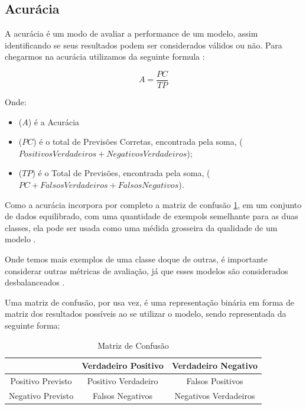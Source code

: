 \documentclass[
	12pt,				%
	openright,			%
	oneside,			%
	a4paper,			%
	english,			%
	brazil				%
	]{abntex2}
\begin{document}
\subsection{Acurácia}

A acurácia é um modo de avaliar a performance de um modelo, assim identificando se seus resultados podem
ser considerados válidos ou não. Para chegarmos na acurácia utilizamos da seguinte formula \cite{acuracia}:

\begin{equation}
	\label{acuracia}
	A = \frac{PC}{TP}
\end{equation}

Onde:
\begin{itemize}
	\item ($A$) é a Acurácia
	\item ($PC$) é o total de Previsões Corretas, encontrada pela soma, ($Positivos Verdadeiros + Negativos Verdadeiros$);
	\item ($TP$) é o Total de Previsões, encontrada pela soma, ($PC + Falsos Verdadeiros + Falsos Negativos$).
\end{itemize}

Como a acurácia incorpora por completo a matriz de confusão \ref{Matriz de Confusão}, em um conjunto de dados equilibrado, 
com uma quantidade de exempols semelhante para as duas classes, ela pode ser usada como uma médida grosseira da qualidade 
de um modelo \cite{acuracia_matriz}.

Onde temos mais exemplos de uma classe doque de outras, é importante considerar outras métricas de avaliação, já que esses
modelos são considerados desbalanceados \cite{acuracia}.

Uma matriz de confusão, por usa vez, é uma representação binária em forma de matriz dos resultados possíveis ao se utilizar 
o modelo, sendo representada da seguinte forma:

\begin{table}[h!]
	\centering
	\caption{\label{Matriz de Confusão}Matriz de Confusão}
	\begin{tabular}{|c|c|c|}
	\hline
					  & Verdadeiro Positivo & Verdadeiro Negativo   \\ \hline
	Positivo Previsto & Positivo Verdadeiro & Falsos Positivos      \\ \hline
	Negativo Previsto & Falsos Negativos    & Negativos Verdadeiros \\ \hline
	\end{tabular}
\end{table}
\end{document}

